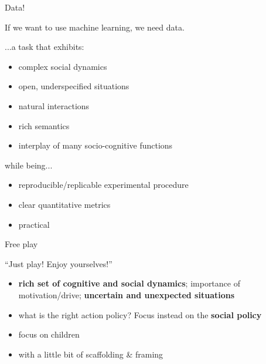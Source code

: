 \documentclass[xcolor=table]{beamer}
\begin{document}
\begin{frame}{Data!}

    If we want to use machine learning, we need data.
    
    \pause

    ...a task that exhibits:

    \begin{itemize}
        \item complex social dynamics
        \item open, underspecified situations
        \item natural interactions
        \item rich semantics
        \item interplay of many socio-cognitive functions
    \end{itemize}

    \pause

    while being...
    \begin{itemize}
        \item reproducible/replicable experimental procedure
        \item clear quantitative metrics
        \item practical
    \end{itemize}
\end{frame}


\begin{frame}{Free play}

    \begin{center}
    {\Large ``Just play! Enjoy yourselves!''}
    \end{center}

    \vspace{3em}

    \begin{itemize}
        \item \textbf{rich set of cognitive and
            social dynamics}; importance of motivation/drive; \textbf{uncertain
            and unexpected situations}
        \item what is the right action policy? Focus instead on the \textbf{social policy}
    \end{itemize}
    \pause
    \begin{itemize}
        \item focus on children
        \item with a little bit of scaffolding \& framing
    \end{itemize}


\end{frame}
\end{document}
